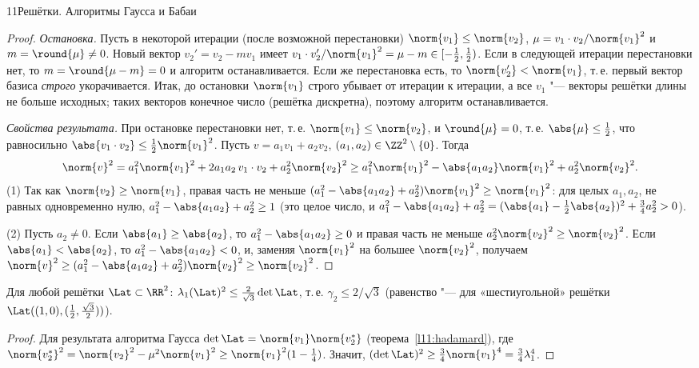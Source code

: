 \begin{lecture}{11}{Решётки. Алгоритмы Гаусса и Бабаи}
\begin{proof}
\emph{Остановка.} Пусть в некоторой итерации (после возможной перестановки)
$\norm{v_1} \le \norm{v_2}$, $\mu = v_1 \cdot v_2 / \norm{v_1}^2$ и $m = \round{\mu} \ne 0$.
Новый вектор $v_2' = v_2 - m v_1$ имеет $v_1 \cdot v_2' / \norm{v_1}^2 = \mu - m \in
[-\frac12, \frac12)$. Если в следующей итерации перестановки нет, то $m = \round{\mu - m} = 0$
и алгоритм останавливается. Если же перестановка есть, то $\norm{v_2'} < \norm{v_1}$, т.\,е.
первый вектор базиса \emph{строго} укорачивается. Итак, до остановки $\norm{v_1}$ строго
убывает от итерации к итерации, а все $v_1$ "--- векторы решётки длины не больше исходных;
таких векторов конечное число (решётка дискретна), поэтому алгоритм останавливается.

\emph{Свойства результата.} При остановке перестановки нет, т.\,е. $\norm{v_1} \le \norm{v_2}$, и
$\round{\mu} = 0$, т.\,е. $\abs{\mu} \le \frac12$, что равносильно $\abs{v_1 \cdot v_2} \le
\frac12\norm{v_1}^2$. Пусть $v = a_1 v_1 + a_2 v_2$, $(a_1, a_2) \in \ZZ^2 \setminus \{0\}$. Тогда
\[
  \norm{v}^2 = a_1^2 \norm{v_1}^2 + 2a_1a_2\, v_1 \cdot v_2 + a_2^2 \norm{v_2}^2
  \ge a_1^2 \norm{v_1}^2 - \abs{a_1a_2}\norm{v_1}^2 + a_2^2 \norm{v_2}^2.
\]
(1) Так как $\norm{v_2} \ge \norm{v_1}$, правая часть не меньше
$(a_1^2 - \abs{a_1a_2} + a_2^2)\norm{v_1}^2 \ge \norm{v_1}^2$: для целых $a_1, a_2$, не равных
одновременно нулю, $a_1^2 - \abs{a_1a_2} + a_2^2 \ge 1$ (это целое число, и
$a_1^2 - \abs{a_1a_2} + a_2^2 = (\abs{a_1} - \frac12\abs{a_2})^2 + \frac34 a_2^2 > 0$).

(2) Пусть $a_2 \ne 0$. Если $\abs{a_1} \ge \abs{a_2}$, то $a_1^2 - \abs{a_1a_2} \ge 0$ и правая
часть не меньше $a_2^2 \norm{v_2}^2 \ge \norm{v_2}^2$. Если $\abs{a_1} < \abs{a_2}$, то
$a_1^2 - \abs{a_1a_2} < 0$, и, заменяя $\norm{v_1}^2$ на большее $\norm{v_2}^2$, получаем
$\norm{v}^2 \ge (a_1^2 - \abs{a_1a_2} + a_2^2)\norm{v_2}^2 \ge \norm{v_2}^2$.
\end{proof}

\begin{corollary}\label{l11:gamma2}
Для любой решётки $\Lat \subset \RR^2$: $\lambda_1(\Lat)^2 \le \frac{2}{\sqrt3}\det \Lat$, т.\,е.
$\gamma_2 \le 2/\sqrt3$ (равенство "--- для «шестиугольной» решётки $\Lat((1, 0), (\frac12,
\frac{\sqrt3}{2}))$).
\end{corollary}

\begin{proof}
Для результата алгоритма Гаусса
$\det \Lat = \norm{v_1}\norm{v_2^*}$ (теорема~\ref{l11:hadamard}), где
$\norm{v_2^*}^2 = \norm{v_2}^2 - \mu^2 \norm{v_1}^2 \ge \norm{v_1}^2 (1 - \frac14)$. Значит,
$(\det \Lat)^2 \ge \frac34 \norm{v_1}^4 = \frac34 \lambda_1^4$.
\end{proof}


\end{lecture}
